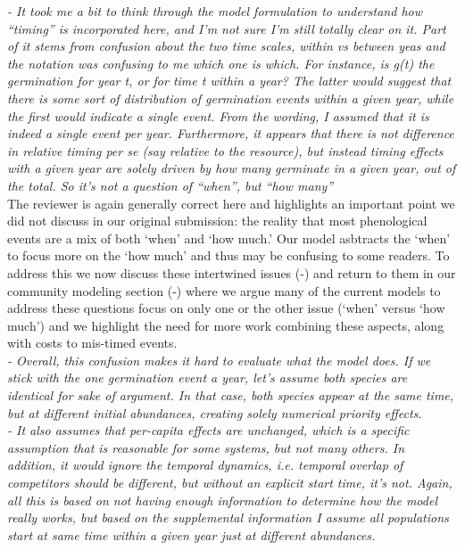 \documentclass[11pt]{article}
\begin{document}
\emph{-       It took me a bit to think through the model formulation to understand how ``timing'' is
incorporated here, and I'm not sure I'm still totally clear on it. Part of it stems from
confusion about the two time scales, within vs between yeas and the notation was confusing to
me which one is which. For instance, is g(t) the germination for year t, or for time t within
a year? The latter would suggest that there is some sort of distribution of germination
events within a given year, while the first would indicate a single event. From the wording,
I assumed that it is indeed a single event per year. Furthermore, it appears that there is
not difference in relative timing per se (say relative to the resource), but instead timing
 effects with a given year are solely driven by how many germinate in a given year, out of the
total. So it's not a question of ``when'', but ``how many''}\\

The reviewer is again generally correct here and highlights an important point we did not discuss in our original submission: the reality that most phenological events are a mix of both `when' and `how much.' Our model asbtracts the `when' to focus more on the `how much' and thus may be confusing to some readers. To address this we now discuss these intertwined issues (-) and return to them in our community modeling section (-) where we argue many of the current models to address these questions focus on only one or the other issue (`when' versus `how much') and we highlight the need for more work combining these aspects, along with costs to mis-timed events. \\

\emph{-       Overall, this confusion makes it hard to evaluate what the model does. If we stick
with the one germination event a year, let's assume both species are identical for sake of
argument. In that case, both species appear at the same time, but at different initial
abundances, creating solely numerical priority effects.\\
-       It also assumes that per-capita effects are unchanged, which is a specific assumption
that is reasonable for some systems, but not many others.  In addition, it would ignore the
temporal dynamics, i.e. temporal overlap of competitors should be different, but without an
explicit start time, it's not. Again, all this is based on not having enough information to
determine how the model really works, but based on the supplemental information I assume all
populations start at same time within a given year just at different abundances.}\\
\end{document}
